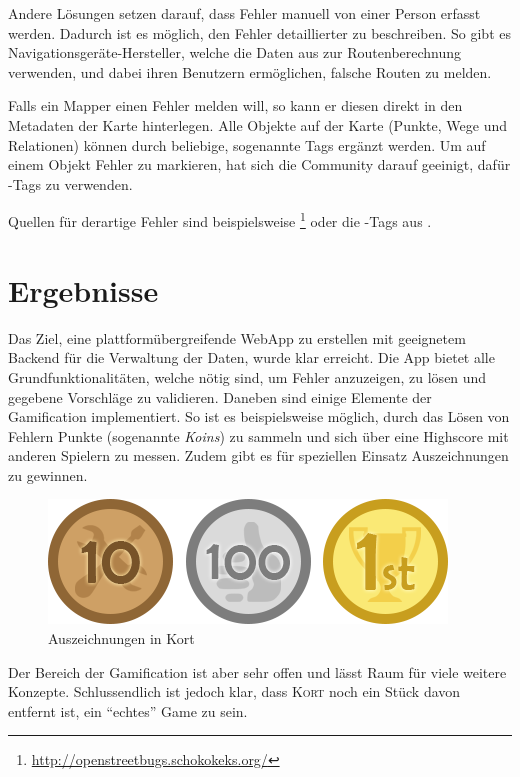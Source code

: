 Andere Lösungen setzen darauf, dass Fehler manuell von einer Person erfasst werden. Dadurch ist es möglich, den Fehler detaillierter zu beschreiben. 
So gibt es Navigationsgeräte-Hersteller, welche die Daten aus  zur Routenberechnung verwenden, und dabei ihren Benutzern ermöglichen, falsche Routen zu melden.

Falls ein \gls{Mapper} einen Fehler melden will, so kann er diesen direkt in den Metadaten der Karte hinterlegen. Alle Objekte auf der Karte (Punkte, Wege und Relationen) können durch beliebige, sogenannte  \glspl{Tag} ergänzt werden.
Um auf einem Objekt Fehler zu markieren, hat sich die Community darauf geeinigt, dafür -\glspl{Tag} zu verwenden.

Quellen für derartige Fehler sind beispielsweise \footnote{\url{http://openstreetbugs.schokokeks.org/}} oder die -\glspl{Tag} aus .

\section*{Ergebnisse}
Das Ziel, eine plattformübergreifende \gls{WebApp} zu erstellen mit geeignetem Backend für die Verwaltung der Daten, wurde klar erreicht.
Die App \kort{} bietet alle Grundfunktionalitäten, welche nötig sind, um Fehler anzuzeigen, zu lösen und gegebene Vorschläge zu validieren.
Daneben sind einige Elemente der \gls{Gamification} implementiert. So ist es beispielsweise möglich, durch das Lösen von Fehlern Punkte (sogenannte \emph{Koins}) zu sammeln und sich über eine Highscore mit anderen Spielern zu messen.
Zudem gibt es für speziellen Einsatz Auszeichnungen zu gewinnen.

\begin{figure}[H]
	\centering
	\includegraphics[scale=0.6]{images/gamification/gamification-badges}
	\caption{Auszeichnungen in Kort}
	\label{image-kort-badges}
\end{figure}

Der Bereich der \gls{Gamification} ist aber sehr offen und lässt Raum für viele weitere Konzepte. Schlussendlich ist jedoch klar, dass \textsc{Kort} noch ein Stück davon entfernt ist, ein "`echtes"' Game zu sein.

